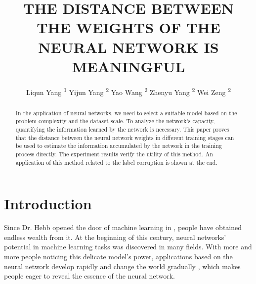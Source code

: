 \documentclass[letterpaper]{article} %
\title{THE DISTANCE BETWEEN THE WEIGHTS OF THE NEURAL NETWORK IS
MEANINGFUL\\}
\author{
    Liqun Yang \textsuperscript{\rm 1}
    Yijun Yang \textsuperscript{\rm 2}
    Yao Wang \textsuperscript{\rm 2}
    Zhenyu Yang \textsuperscript{\rm 2}
    Wei Zeng \textsuperscript{\rm 2}\\
}
\begin{document}
\maketitle

\begin{abstract}
In the application of neural networks, we need to select a suitable model based on the problem complexity and the dataset scale. To analyze the network's capacity, quantifying the information learned by the network is necessary. This paper proves that the distance between the neural network weights in different training stages can be used to estimate the information accumulated by the network in the training process directly. The experiment results verify the utility of this method. An application of this method related to the label corruption is shown at the end.
\end{abstract}

\section{Introduction}
Since Dr. Hebb opened the door of machine learning in \cite{hebb1949organization}, people have obtained endless wealth from it. At the beginning of this century, neural networks' potential in machine learning tasks was discovered in many fields. With more and more people noticing this delicate model's power, applications based on the neural network develop rapidly and change the world gradually \cite{rumelhart1986learning,hochreiter1997long,fukushima1980neocognitron,lecun2015deep,hinton1994autoencoders,sajjadi2017enhancenet,he2017mask,an2015variational,arjovsky2017wasserstein}, which makes people eager to reveal the essence of the neural network.
\end{document}

